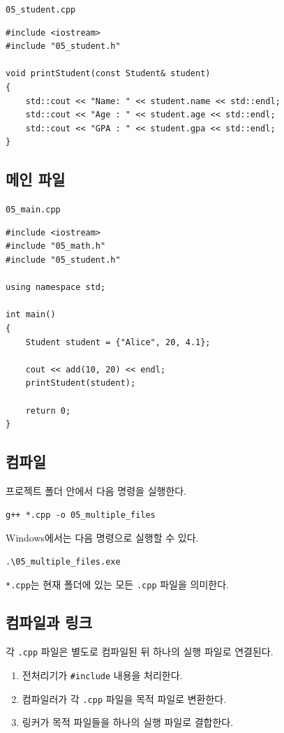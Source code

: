 \documentclass[11pt,a4paper]{article}
\begin{document}
\texttt{05\_student.cpp}

\begin{lstlisting}
#include <iostream>
#include "05_student.h"

void printStudent(const Student& student)
{
    std::cout << "Name: " << student.name << std::endl;
    std::cout << "Age : " << student.age << std::endl;
    std::cout << "GPA : " << student.gpa << std::endl;
}
\end{lstlisting}

\subsection{메인 파일}

\texttt{05\_main.cpp}

\begin{lstlisting}
#include <iostream>
#include "05_math.h"
#include "05_student.h"

using namespace std;

int main()
{
    Student student = {"Alice", 20, 4.1};

    cout << add(10, 20) << endl;
    printStudent(student);

    return 0;
}
\end{lstlisting}

\subsection{컴파일}

프로젝트 폴더 안에서 다음 명령을 실행한다.

\begin{verbatim}
g++ *.cpp -o 05_multiple_files
\end{verbatim}

Windows에서는 다음 명령으로 실행할 수 있다.

\begin{verbatim}
.\05_multiple_files.exe
\end{verbatim}

\texttt{*.cpp}는 현재 폴더에 있는 모든 \texttt{.cpp} 파일을 의미한다.

\subsection{컴파일과 링크}

각 \texttt{.cpp} 파일은 별도로 컴파일된 뒤 하나의 실행 파일로 연결된다.

\begin{enumerate}
    \item 전처리기가 \texttt{\#include} 내용을 처리한다.
    \item 컴파일러가 각 \texttt{.cpp} 파일을 목적 파일로 변환한다.
    \item 링커가 목적 파일들을 하나의 실행 파일로 결합한다.
\end{enumerate}
\end{document}
